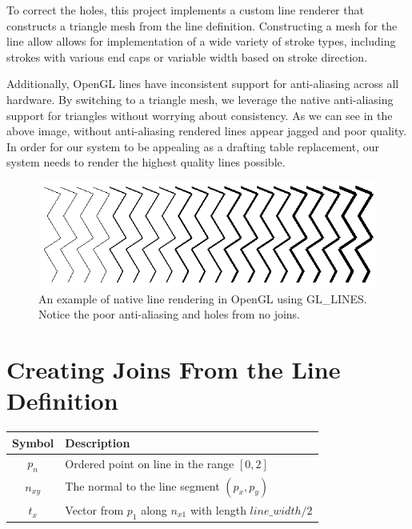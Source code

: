 \documentclass[11pt]{report}
\begin{document}
To correct the holes, this project implements a custom line renderer that constructs a triangle mesh from the line definition.
Constructing a mesh for the line allow allows for implementation of a wide variety of stroke types, including strokes with various end caps or variable width based on stroke direction. 

Additionally, OpenGL lines have inconsistent support for anti-aliasing across all hardware.
By switching to a triangle mesh, we leverage the native anti-aliasing support for triangles without worrying about consistency.
As we can see in the above image, without anti-aliasing rendered lines appear jagged and poor quality.
In order for our system to be appealing as a drafting table replacement, our system needs to render the highest quality lines possible.

\begin{figure}
\includegraphics[width=\linewidth]{opengllines}
\caption{An example of native line rendering in OpenGL using GL\_LINES. Notice the poor anti-aliasing and holes from no joins.}
\end{figure}

\pagebreak
\section{Creating Joins From the Line Definition}

\begin{center}

\begin{tabular}{|c|l|}
\hline
\textbf{Symbol} & \textbf{Description} \\ \hline
$p_n$			& Ordered point on line in the range $[0,2]$ \\
$n_{xy}$		& The normal to the line segment $(p_x, p_y)$ \\	
$t_x$			& Vector from $p_1$ along $n_{x1}$ with length $line\_width/2$ \\
\hline
\end{tabular}
 \label{tab:title}
\end{center}
\end{document}
